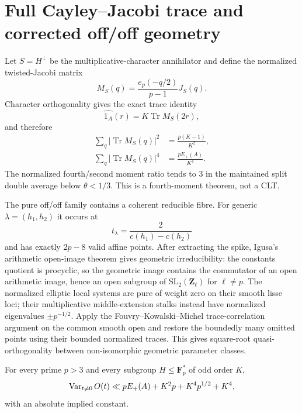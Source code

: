 \section{Full Cayley--Jacobi trace and corrected off/off geometry}

Let $S=H^\perp$ be the multiplicative-character annihilator and define the
normalized twisted-Jacobi matrix
\[
M_S(q)=\frac{e_p(-q/2)}{p-1}J_S(q).
\]
Character orthogonality gives the exact trace identity
\begin{equation}\label{eq:jacobi}
\widehat{1_A}(r)=K\operatorname{Tr}M_S(2r),
\end{equation}
and therefore
\begin{align}
\sum_q|\operatorname{Tr}M_S(q)|^2&=\frac{p(K-1)}{K^2},\label{eq:trace2}\\
\sum_q|\operatorname{Tr}M_S(q)|^4&=\frac{pE_+(A)}{K^4}.\label{eq:trace4}
\end{align}
The normalized fourth/second moment ratio tends to $3$ in the maintained split
double average below $\theta<1/3$.  This is a fourth-moment theorem, not a CLT.

The pure off/off family contains a coherent reducible fibre.  For generic
$\lambda=(h_1,h_2)$ it occurs at
\[
t_\lambda=\frac{2}{c(h_1)-c(h_2)}
\]
and has exactly $2p-8$ valid affine points.  After extracting the spike,
Igusa's arithmetic open-image theorem \cite{BLV2009} gives geometric
irreducibility: the constants quotient is procyclic, so the geometric image
contains the commutator of an open arithmetic image, hence an open subgroup
of $\mathrm{SL}_2(\mathbf Z_\ell)$ for $\ell\ne p$.
The normalized elliptic local systems are pure of weight zero on their smooth
lisse loci; their multiplicative middle-extension stalks instead have
normalized eigenvalues $\pm p^{-1/2}$.
Apply the Fouvry--Kowalski--Michel trace-correlation argument \cite{FKM2013}
on the common smooth open and restore the boundedly many omitted points using
their bounded normalized traces.  This gives square-root quasi-orthogonality
between non-isomorphic geometric parameter classes.

\begin{theorem}\label{thm:offoff}
For every prime $p>3$ and every subgroup $H\le\mathbf F_p^\ast$ of
odd order $K$,
\begin{equation}\label{eq:offoff}
\operatorname{Var}_{t\ne0}O(t)
\ll pE_+(A)+K^2p+K^4p^{1/2}+K^4,
\end{equation}
with an absolute implied constant.
\end{theorem}

